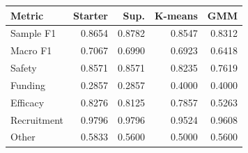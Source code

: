 \begin{tabular}{lrrrr}
\toprule
Metric & Starter & Sup. & K-means & GMM \\
\midrule
Sample F1 & 0.8654 & 0.8782 & 0.8547 & 0.8312 \\
Macro F1 & 0.7067 & 0.6990 & 0.6923 & 0.6418 \\
Safety & 0.8571 & 0.8571 & 0.8235 & 0.7619 \\
Funding & 0.2857 & 0.2857 & 0.4000 & 0.4000 \\
Efficacy & 0.8276 & 0.8125 & 0.7857 & 0.5263 \\
Recruitment & 0.9796 & 0.9796 & 0.9524 & 0.9608 \\
Other & 0.5833 & 0.5600 & 0.5000 & 0.5600 \\
\bottomrule
\end{tabular}

